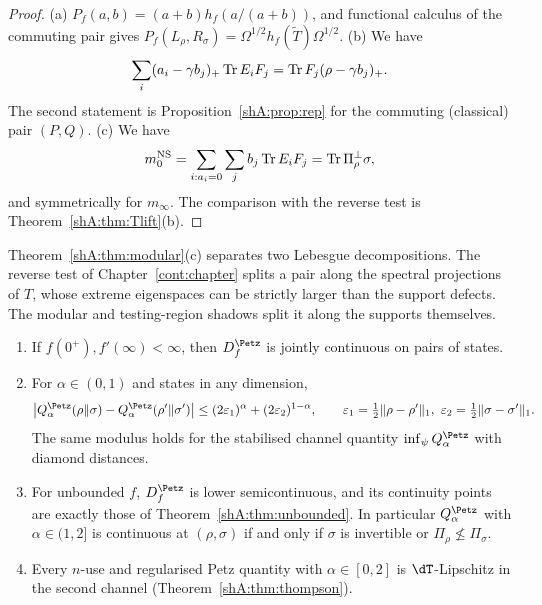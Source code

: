 \begin{proof}
(a) $P_f(a,b)=(a+b)h_f(a/(a+b))$, and functional calculus of the commuting pair gives $P_f(L_\rho,R_\sigma)=\Omega^{1/2}h_f(\widetilde T)\Omega^{1/2}$. (b) We have
\[
\sum_i(a_i-\gamma b_j)_+\operatorname{Tr} E_iF_j=\operatorname{Tr} F_j(\rho-\gamma b_j)_+.
\]
The second statement is Proposition~\ref{shA:prop:rep} for the commuting (classical) pair $(P,Q)$. (c) We have
\[
m_0^{\mathrm{NS}}=\sum_{i:a_i=0}\sum_jb_j\operatorname{Tr} E_iF_j=\operatorname{Tr}\Pi_\rho^\perp\sigma,
\]
and symmetrically for $m_\infty$. The comparison with the reverse test is Theorem~\ref{shA:thm:Tlift}(b).
\end{proof}

Theorem~\ref{shA:thm:modular}(c) separates two Lebesgue decompositions. The reverse test of Chapter~\ref{cont:chapter} splits a pair along the spectral projections of $T$, whose extreme eigenspaces can be strictly larger than the support defects. The modular and testing-region shadows split it along the supports themselves.

\begin{theorem}\label{shA:thm:petzcont}
\begin{enumerate}[label=(\alph*)]
\item If $f(0^+),f'(\infty)<\infty$, then $D^\Petz_f$ is jointly continuous on pairs of states.
\item For $\alpha\in(0,1)$ and states in any dimension,
\[
\big|Q^\Petz_\alpha(\rho\|\sigma)-Q^\Petz_\alpha(\rho'\|\sigma')\big|\le(2\varepsilon_1)^\alpha+(2\varepsilon_2)^{1-\alpha},\qquad \varepsilon_1=\tfrac12\|\rho-\rho'\|_1,\ \varepsilon_2=\tfrac12\|\sigma-\sigma'\|_1 .
\]
The same modulus holds for the stabilised channel quantity $\inf_\psi Q^\Petz_\alpha$ with diamond distances.
\item For unbounded $f$, $D^\Petz_f$ is lower semicontinuous, and its continuity points are exactly those of Theorem~\ref{shA:thm:unbounded}. In particular $Q^\Petz_\alpha$ with $\alpha\in(1,2]$ is continuous at $(\rho,\sigma)$ if and only if $\sigma$ is invertible or $\Pi_\rho\not\le\Pi_\sigma$.
\item Every $n$-use and regularised Petz quantity with $\alpha\in[0,2]$ is $\dT$-Lipschitz in the second channel (Theorem~\ref{shA:thm:thompson}).
\end{enumerate}
\end{theorem}

